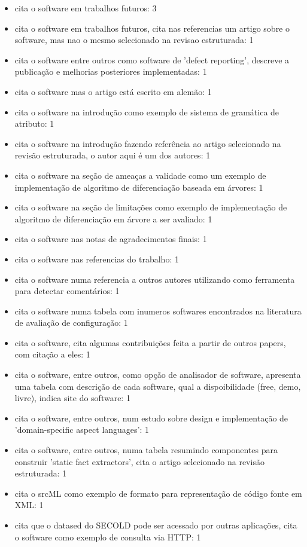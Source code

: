 \begin{itemize}
\item cita o software em trabalhos futuros: 3
\item cita o software em trabalhos futuros, cita nas referencias um artigo sobre o software, mas nao o mesmo selecionado na revisao estruturada: 1
\item cita o software entre outros como software de 'defect reporting', descreve a publicação e melhorias posteriores implementadas: 1
\item cita o software mas o artigo está escrito em alemão: 1
\item cita o software na introdução como exemplo de sistema de gramática de atributo: 1
\item cita o software na introdução fazendo referência ao artigo selecionado na revisão estruturada, o autor aqui é um dos autores: 1
\item cita o software na seção de ameaças a validade como um exemplo de implementação de algoritmo de diferenciação baseada em árvores: 1
\item cita o software na seção de limitações como exemplo de implementação de algoritmo de diferenciação em árvore a ser avaliado: 1
\item cita o software nas notas de agradecimentos finais: 1
\item cita o software nas referencias do trabalho: 1
\item cita o software numa referencia a outros autores utilizando como ferramenta para detectar comentários: 1
\item cita o software numa tabela com inumeros softwares encontrados na literatura de avaliação de configuração: 1
\item cita o software, cita algumas contribuições feita a partir de outros papers, com citação a eles: 1
\item cita o software, entre outros, como opção de analisador de software, apresenta uma tabela com descrição de cada software, qual a dispoibilidade (free, demo, livre), indica site do software: 1
\item cita o software, entre outros, num estudo sobre design e implementação de 'domain-specific aspect languages': 1
\item cita o software, entre outros, numa tabela resumindo componentes para construir 'static fact extractors', cita o artigo selecionado na revisão estruturada: 1
\item cita o srcML como exemplo de formato para representação de código fonte em XML: 1
\item cita que o datased do SECOLD pode ser acessado por outras aplicações, cita o software como exemplo de consulta via HTTP: 1

\end{itemize}
